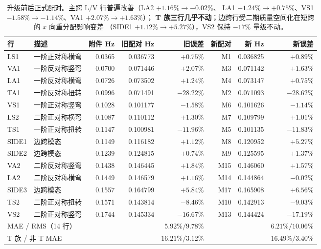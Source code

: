 \documentclass[11pt,a4paper]{ctexart}
\begin{document}
\begin{table}[h]\centering\small
\begin{tabular}{llrrrrrr}
\toprule
行 & 描述 & 附件 Hz & 旧配对 Hz & 旧误差 & 新配对 & 新 Hz & 新误差 \\
\midrule
LS1 & 一阶正对称横弯 & 0.0365 & 0.036773 & $+0.75\%$ & M1 & 0.036825 & $+0.89\%$ \\
VA1 & 一阶反对称竖弯 & 0.0700 & 0.071446 & $+2.07\%$ & M3 & 0.071142 & $+1.63\%$ \\
LA1 & 一阶反对称横弯 & 0.0726 & 0.073502 & $+1.24\%$ & M4 & 0.073147 & $+0.75\%$ \\
TA1 & 一阶反对称扭转 & 0.0996 & 0.071491 & $-28.22\%$ & M2 & 0.071093 & $\bm{-28.62\%}$ \\
VS1 & 一阶正对称竖弯 & 0.1028 & 0.101177 & $-1.58\%$ & M6 & 0.101626 & $-1.14\%$ \\
LS2 & 二阶正对称横弯 & 0.1087 & 0.110112 & $+1.30\%$ & M7 & 0.109799 & $+1.01\%$ \\
TS1 & 一阶正对称扭转 & 0.1147 & 0.100981 & $-11.96\%$ & M5 & 0.101135 & $\bm{-11.83\%}$ \\
SIDE1 & 边跨模态 & 0.1149 & 0.116182 & $+1.12\%$ & M8 & 0.120952 & $+5.27\%$ \\
SIDE2 & 边跨模态 & 0.1239 & 0.124815 & $+0.74\%$ & M9 & 0.125595 & $+1.37\%$ \\
VA2 & 二阶反对称竖弯 & 0.1438 & 0.146445 & $+1.84\%$ & M15 & 0.146060 & $+1.57\%$ \\
LA2 & 二阶反对称横弯 & 0.1449 & 0.146579 & $+1.16\%$ & M14 & 0.144864 & $-0.02\%$ \\
SIDE3 & 边跨模态 & 0.1557 & 0.164799 & $+5.84\%$ & M17 & 0.165908 & $+6.56\%$ \\
TS2 & 二阶正对称扭转 & 0.1571 & 0.143814 & $-8.46\%$ & M10 & 0.142913 & $\bm{-9.03\%}$ \\
VS2 & 二阶正对称竖弯 & 0.1744 & 0.145334 & $-16.67\%$ & M13 & 0.144424 & $-17.19\%$ \\
\midrule
\multicolumn{4}{l}{MAE / RMS（14 行）} & $5.92\%/9.78\%$ & & & $6.21\%/10.06\%$ \\
\multicolumn{4}{l}{T 族 / 非 T MAE} & $16.21\%/3.12\%$ & & & $16.49\%/3.40\%$ \\
\bottomrule
\end{tabular}
\caption{升级前后正式配对。主跨 L/V 行普遍改善（LA2 $+1.16\%\to-0.02\%$、
LA1 $+1.24\%\to+0.75\%$、VS1 $-1.58\%\to-1.14\%$、VA1 $+2.07\%\to+1.63\%$）；
\textbf{T 族三行几乎不动}；边跨行受二期质量空间化在短跨的 $x$ 向重分配影响变差
（SIDE1 $+1.12\%\to+5.27\%$），VS2 保持 $-17\%$ 量级不动。}
\label{tab:match}
\end{table}
\end{document}
